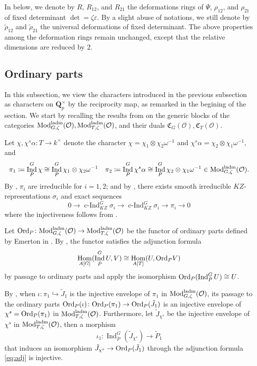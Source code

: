 \documentclass[leqno]{amsart}
\newcommand{\laMod}{\textnormal{Mod}^{\textnormal{ladm}}}
\newcommand{\Ord}{\textnormal{Ord}}
\newcommand{\Qp}{\mathbf{Q}_p}
\newcommand{\oo}{\mathcal O}
\newcommand{\1}{\mathbf{1}}
\newcommand{\fC}{\mathfrak C}
\DeclareMathOperator{\Hom}{Hom}
\DeclareMathOperator{\Ind}{Ind}
\DeclareMathOperator{\cInd}{c-Ind}
\theoremstyle{definition}
\theoremstyle{remark}
\begin{document}
In below, we denote by 
$R$,  $R_{12}$, and $R_{21}$
the deformations rings of 
$\Psi$,  $\rho_{12}$, and $\rho_{21}$
of fixed determinant $\det=\zeta\varepsilon$.
By a slight abuse of notations,
we still denote by $\tilde{\rho}_{12}$
and $\tilde{\rho}_{21}$ the universal deformations
of fixed determinant.
The above properties among the deformation rings
remain unchanged,
except that the relative dimensions are reduced by $2$.

\subsection{Ordinary parts}

In this subsection,
we view the characters introduced 
in the previous subsection as characters
on $\Qp^\times$ by the reciprocity map,
as remarked in the begining of the section.
We start by recalling the results from
\cite[\S 7 \S 8]{pask}
on the generic blocks of the categories
$\laMod_{G,\zeta}(\oo), \laMod_{T,\zeta}(\oo)$,
and their duals $\fC_G(\oo), \fC_T(\oo)$.

Let $\chi, \chi^s\alpha\colon T\to k^\times$
denote the character  
$\chi=\chi_1\otimes\chi_2\omega^{-1}$
and  $\chi^s\alpha=\chi_2\otimes \chi_1\omega^{-1}$, and
\[
\pi_1\coloneqq \Ind_{P}^G\chi\cong
\Ind_{P}^G\chi_1\otimes\chi_2\omega^{-1}\quad
\pi_2\coloneqq \Ind_{P}^G\chi^s\alpha\cong 
\Ind_{P}^G\chi_2\otimes\chi_1\omega^{-1} \in \laMod_{G,\zeta}(\oo).
\]
By \cite[Thm 30]{barthel},
$\pi_i$ are irreducible for  $i=1,2$;
and by \cite[Thm 33]{barthel}, there exists
smooth irreducible $KZ$-representations $\sigma_i$
and exact sequences
\begin{equation}
	0\to \cInd_{KZ}^G\sigma_i\to
	\cInd_{KZ}^G\sigma_i\to \pi_i\to 0
\end{equation}
where the injectiveness follows from \cite[Thm 19]{barthel}.


Let
$\Ord_P\colon \laMod_{G,\zeta}(\oo)\to \laMod_{T,\zeta}(\oo)$
be the functor of ordinary parts
defined by Emerton in \cite{eme}.
By \cite[Thm 4.4.6]{eme},
the functor satisfies the adjunction formula
\begin{equation}\label{eq:adj}
	\Hom_{A[G]}(\Ind_{\bar{P}}^GU,V)\cong
	\Hom_{A[T]}(U,\Ord_PV)
\end{equation}
by passage to ordinary parts and apply the isomorphism 
$\Ord_P(\Ind_{\bar{P}}^GU)\cong U$.

By \cite[Prop 7.1]{pask},
when $\iota\colon \pi_1\hookrightarrow \tilde{J}_1$
is the injective envelope of $\pi_1$
in $\laMod_{G,\zeta}(\oo)$,
its passage to the ordinary parts
$\Ord_P(\iota)\colon \Ord_P(\pi_1)\to \Ord_P(\tilde{J}_1)$
is an injective envelope of $\chi^s=\Ord_P(\pi_1)$
in $\laMod_{T,\zeta}(\oo)$.
Furthermore, 
let $\tilde{J}_{\chi^s}$
be the injective envelope of $\chi^s$
in $\laMod_{T,\zeta}(\oo)$,
then a morphism
\begin{equation}
	\iota_1\colon \Ind_{\bar{P}}^G(\tilde{J}_{\chi^s})\to \tilde{P}_1
\end{equation}
that induces an isomorphism 
$\tilde{J}_{\chi^s}\to \Ord_P(\tilde{J}_1)$
through the adjunction formula \eqref{eq:adj}
is injective.
\end{document}
